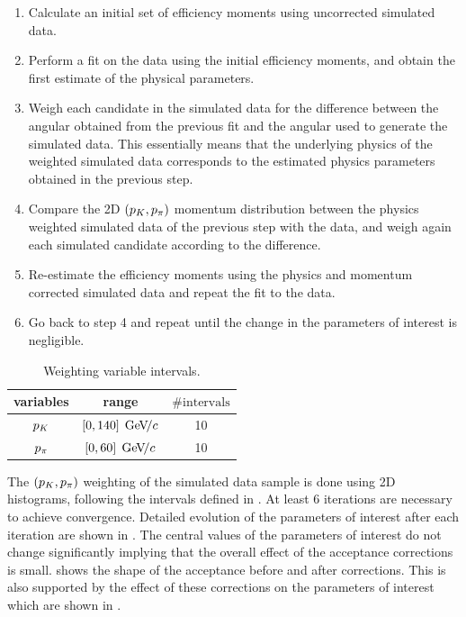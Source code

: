 \begin{enumerate}
\item Calculate an initial set of efficiency moments using uncorrected \BsJpsiKst simulated data.
\item Perform a fit on the \BsJpsiKst data using the initial efficiency moments, and obtain the first estimate of the physical parameters.
\item Weigh each candidate in the simulated data for the difference between the angular \pdf obtained from the previous fit and the angular
      \pdf used to generate the simulated data. This essentially means that the underlying physics of the weighted simulated data corresponds
      to the estimated physics parameters obtained in the previous step.
\item Compare the 2D $(p_K,p_\pi)$ momentum distribution between the physics weighted simulated data of the previous step with the
      data, and weigh again each simulated candidate according to the difference.
\item Re-estimate the efficiency moments using the physics and momentum corrected \BsJpsiKst simulated data and repeat the fit to the \BsJpsiKst data.
\item Go back to step 4 and repeat until the change in the parameters of interest is negligible.
\end{enumerate}

\begin{table}[!h]
  \center
  \begin{tabular}{c c c}
    \hline
     variables & range & $\# \text{intervals}$ \\
    \hline
    $p_K$    &  $[0,140] \; {\mathrm{\,Ge\kern -0.1em V\!/}c}$  & 10      \\
    $p_\pi$    &  $[0,60]  \; {\mathrm{\,Ge\kern -0.1em V\!/}c}$  & 10      \\
    \hline
  \end{tabular}
  \caption{\small Weighting variable intervals.}
  \label{angAccBinning}
\end{table}

The $(p_K,p_\pi)$ weighting of the simulated data sample is done using 2D histograms, following the intervals defined in .
At least 6 iterations are necessary to achieve convergence. Detailed evolution of the parameters of interest after each iteration are shown in
. The central values of the parameters of interest do not change significantly implying that the overall effect of the
acceptance corrections is small.  shows the shape of the acceptance before and after corrections.
This is also supported by the effect of these corrections on the parameters of interest which are shown in .

